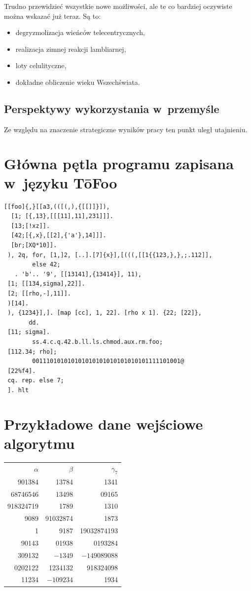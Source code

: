 \documentclass[licencjacka,en]{pracamgr}
\begin{document}
Trudno przewidzieć wszystkie nowe możliwości, ale te co bardziej
oczywiste można wskazać już teraz.  Są to:
\begin{itemize}
\item degryzmolizacja wieńców telecentrycznych,
\item realizacja zimnej reakcji lambliarnej,
\item loty celulityczne,
\item dokładne obliczenie wieku Wszechświata.
\end{itemize}

\section{Perspektywy wykorzystania w~przemyśle}

Ze względu na znaczenie strategiczne wyników pracy ten punkt uległ
utajnieniu.

\appendix

\chapter{Główna pętla programu zapisana w~języku T\=oFoo}

\begin{verbatim}
[[foo]{,}[[a3,(([(,),{[[]]}]),
  [1; [{,13},[[[11],11],231]]].
  [13;[!xz]].
  [42;[{,x},[[2],{'a'},14]]].
  [br;[XQ*10]].
 ), 2q, for, [1,]2, [..].[7]{x}],[(((,[[1{{123,},},;.112]],
        else 42;
   . 'b'.. '9', [[13141],{13414}], 11),
 [1; [[134,sigma],22]].
 [2; [[rho,-],11]].
 )[14].
 ), {1234}],]. [map [cc], 1, 22]. [rho x 1]. {22; [22]},
       dd.
 [11; sigma].
        ss.4.c.q.42.b.ll.ls.chmod.aux.rm.foo;
 [112.34; rho];
        001110101010101010101010101010101111101001@
 [22%f4].
 cq. rep. else 7;
 ]. hlt
\end{verbatim}

\chapter{Przykładowe dane wejściowe algorytmu}

\begin{center}
  \begin{tabular}{rrr}
    $\alpha$ & $\beta$ & $\gamma_7$ \\
    901384 & 13784 & 1341\\
    68746546 & 13498& 09165\\
    918324719& 1789 & 1310 \\
    9089 & 91032874& 1873 \\
    1 & 9187 & 19032874193 \\
    90143 & 01938 & 0193284 \\
    309132 & $-1349$ & $-149089088$ \\
    0202122 & 1234132 & 918324098 \\
    11234 & $-109234$ & 1934 \\
  \end{tabular}
\end{center}
\end{document}
